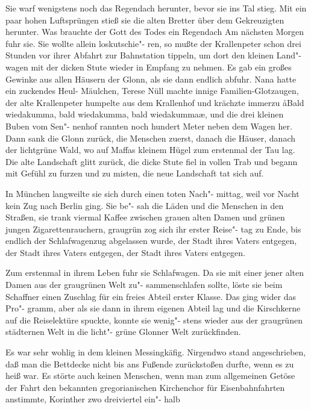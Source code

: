Sie warf wenigstens noch das Regendach herunter, bevor
sie ins Tal stieg. Mit ein paar hohen Luftsprüngen stieß sie
die alten Bretter über dem Gekreuzigten herunter. Was
brauchte der Gott des Todes ein Regendach\ausr{}
\abstand{}
Am nächsten Morgen fuhr sie. Sie wollte allein loskutschie"-%
ren, so mußte der Krallenpeter schon drei Stunden vor ihrer
Abfahrt zur Bahnstation tippeln, um dort den kleinen Land"-%
wagen mit der dicken Stute wieder in Empfang zu nehmen.
Es gab ein großes Gewinke aus allen Häusern der Glonn, als
sie dann endlich abfuhr. Nana hatte ein zuckendes Heul-%
Mäulchen, Terese Nüll machte innige Familien-Glotzaugen,
der alte Krallenpeter humpelte aus dem Krallenhof und
krächzte immerzu\dopp{} \aa{}Bald wiedakumma, bald wiedakumma,
bald wiedakumma\ausr{}\ae{}, und die drei kleinen Buben vom Sen"-%
nenhof rannten noch hundert Meter neben dem Wagen her.
Dann sank die Glonn zurück, die Menschen zuerst, danach die
Häuser, danach der lichtgrüne Wald, wo auf Maffas kleinem
Hügel zum erstenmal der Tau lag. Die alte Landschaft glitt
zurück, die dicke Stute fiel in vollen Trab und begann mit
Gefühl zu furzen und zu misten, die neue Landschaft tat sich
auf.

In München langweilte sie sich durch einen toten Nach"-%
mittag, weil vor Nacht kein Zug nach Berlin ging. Sie be"-%
sah die Läden und die Menschen in den Straßen, sie trank
viermal Kaffee zwischen grauen alten Damen und grünen
jungen Zigarettenrauchern, graugrün zog sich ihr erster Reise"-%
tag zu Ende, bis endlich der Schlafwagenzug abgelassen
wurde, der Stadt ihres Vaters entgegen, der Stadt ihres
Vaters entgegen, der Stadt ihres Vaters entgegen.

Zum erstenmal in ihrem Leben fuhr sie Schlafwagen. Da sie
mit einer jener alten Damen aus der graugrünen Welt zu"-%
sammenschlafen sollte, löste sie beim Schaffner einen Zuschlag
für ein freies Abteil erster Klasse. Das ging wider das Pro"-%
gramm, aber als sie dann in ihrem eigenen Abteil lag und
die Kirschkerne auf die Reiselektüre spuckte, konnte sie wenig"-%
stens wieder aus der graugrünen städternen Welt in die licht"-%
grüne Glonner Welt zurückfinden.

Es war sehr wohlig in dem kleinen Messingkäfig. Nirgendwo
stand angeschrieben, daß man die Bettdecke nicht bis ans
Fußende zurückstoßen durfte, wenn es zu heiß war. Es störte
auch keinen Menschen, wenn man zum allgemeinen Getöse
der Fahrt den bekannten gregorianischen Kirchenchor für
Eisenbahnfahrten anstimmte, Korinther zwo dreiviertel ein"-%
halb\dopp{}

